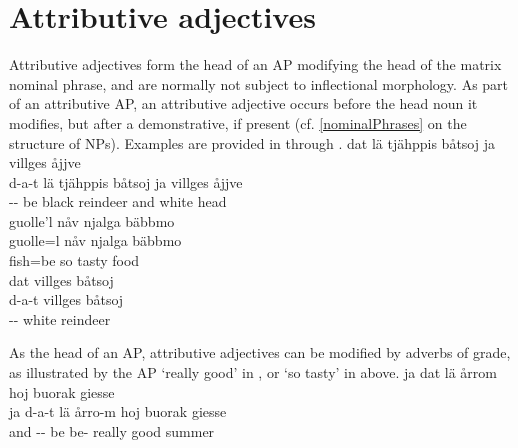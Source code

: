 \section{Attributive adjectives}\label{adjectivesATTR}
Attributive adjectives form the head of an AP modifying the head of the matrix nominal phrase, and are normally not subject to inflectional morphology. 
As part of an attributive AP, an attributive adjective occurs before the head noun it modifies, but after a demonstrative, if present (cf. \SEC\ref{nominalPhrases} on the structure of NPs). Examples are provided in  through . 
\ea\label{adjEx1}
\glll	dat lä tjähppis båtsoj ja villges åjjve\\
	d-a-t lä tjähppis båtsoj ja villges åjjve\\
	-- be\BS{} black reindeer\BS{} and white head\BS{}\\\nopagebreak
{}	
\z
\ea\label{adjEx2}
\glll	guolle'l nåv njalga bäbbmo\\
	guolle=l nåv njalga bäbbmo\\
	fish\BS{}=be\BS{} so tasty food\BS{}\\\nopagebreak
{}	
\z
\ea\label{adjEx3}
\glll	dat villges båtsoj\\
	d-a-t villges båtsoj\\
	-- white reindeer\BS{}\\\nopagebreak
{}	
\z

As the head of an AP, attributive adjectives can be modified by adverbs of grade, as illustrated by the AP  ‘really good’ in , or  ‘so tasty’ in  above.
\ea\label{adjEx4}
\glll	ja dat lä årrom hoj buorak giesse\\
	ja d-a-t lä årro-m hoj buorak giesse\\
	and -- be\BS{} be- really good summer\BS{}\\\nopagebreak
{}	
\z

